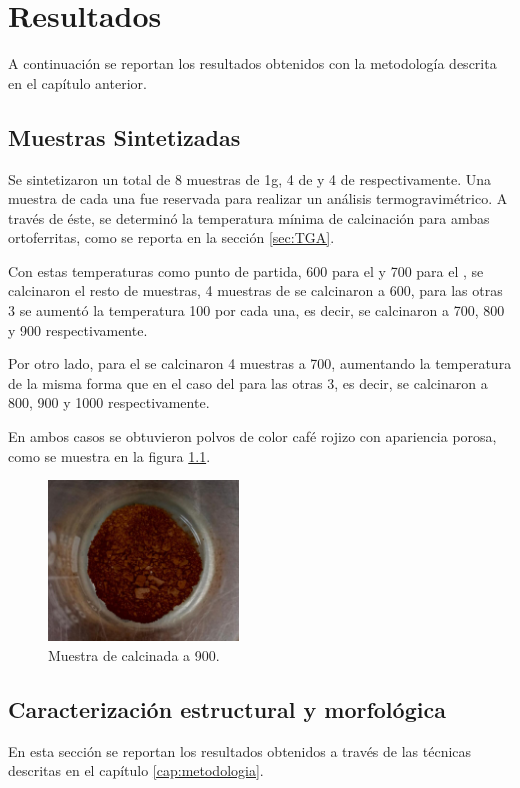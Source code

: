 \documentclass[../main.tex]{subfiles}
\begin{document}
\chapter{Resultados}
A continuación se reportan los resultados obtenidos con la metodología descrita en el capítulo anterior.
\section{Muestras Sintetizadas} \label{sec:sintesis}
Se sintetizaron un total de 8 muestras de 1g, 4 de \neod{} y 4 de \sama{} respectivamente. Una muestra de cada una fue reservada para realizar un análisis termogravimétrico. A través de éste, se determinó la temperatura mínima de calcinación para ambas ortoferritas, como se reporta en la sección \ref{sec:TGA}.

Con estas temperaturas como punto de partida, 600\gradoC{} para el \neod{} y 700\gradoC{} para el \sama{}, se calcinaron el resto de muestras, 4 muestras de \neod{} se calcinaron a 600\gradoC{}, para las otras 3 se aumentó la temperatura 100\gradoC{} por cada una, es decir, se calcinaron a 700, 800 y 900\gradoC{} respectivamente.

Por otro lado, para el \sama{} se calcinaron 4 muestras a 700\gradoC{}, aumentando la temperatura de la misma forma que en el caso del \neod{} para las otras 3, es decir, se calcinaron a 800, 900 y 1000\gradoC{} respectivamente.

En ambos casos se obtuvieron polvos de color café rojizo con apariencia porosa, como se muestra en la figura \ref{fig:resfotomuestra}.
\begin{figure}[H]
    \centering
    \includegraphics[width=0.45\textwidth]{fig/muestraSmFeO3900.jpeg}
    \caption{Muestra de \sama{} calcinada a 900\gradoC.}
    \label{fig:resfotomuestra}
\end{figure}
\section{Caracterización estructural y morfológica}
En esta sección se reportan los resultados obtenidos a través de las técnicas descritas en el capítulo \ref{cap:metodologia}.
\end{document}
